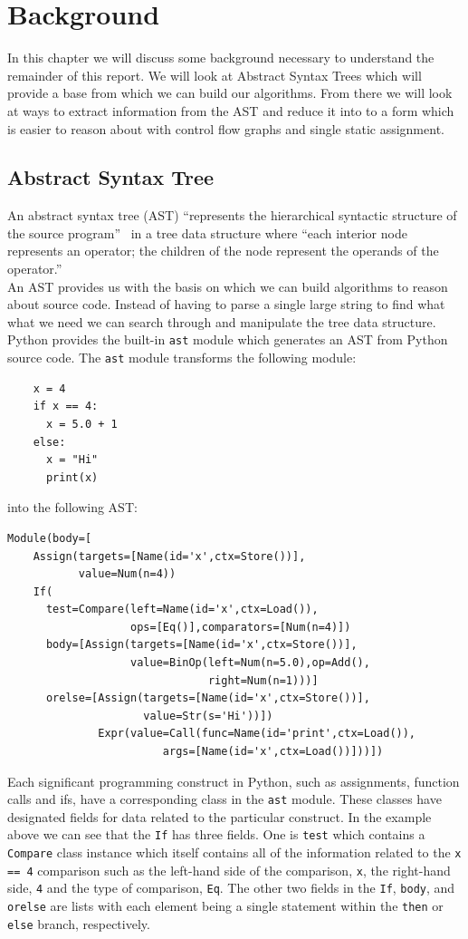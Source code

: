 \documentclass[12pt, titlepage]{article}
\begin{document}
\newpage
\section{Background}
In this chapter we will discuss some background necessary to understand the remainder of this report. We will look at Abstract Syntax Trees which will provide a base from which we can build our algorithms. From there we will look at ways to extract information from the AST and reduce it into to a form which is easier to reason about with control flow graphs and single static assignment.

\subsection{Abstract Syntax Tree}
An abstract syntax tree (AST) ``represents the hierarchical syntactic structure of the source 
program''~\cite{dragonBook} in a tree data structure where ``each 
interior node represents an operator; the children of the node represent the 
operands of the operator.''~\cite{dragonBook} \\
\indent An AST provides us with the basis on which we can build algorithms to reason about source code. Instead of having to parse a single large string to find what what we need we can search through and manipulate the tree data structure. \\
\indent Python provides the built-in \texttt{ast} module which generates an AST from Python source code. The \texttt{ast} module transforms the following module:
\begin{lstlisting}
    x = 4
    if x == 4:
      x = 5.0 + 1
    else:
      x = "Hi"
      print(x)
\end{lstlisting}
into the following AST:
\begin{verbatim}
Module(body=[
    Assign(targets=[Name(id='x',ctx=Store())],
           value=Num(n=4))
    If(
      test=Compare(left=Name(id='x',ctx=Load()),
                   ops=[Eq()],comparators=[Num(n=4)])
      body=[Assign(targets=[Name(id='x',ctx=Store())],
                   value=BinOp(left=Num(n=5.0),op=Add(),
                               right=Num(n=1)))]
      orelse=[Assign(targets=[Name(id='x',ctx=Store())],
                     value=Str(s='Hi'))])
              Expr(value=Call(func=Name(id='print',ctx=Load()),
                        args=[Name(id='x',ctx=Load())]))])
\end{verbatim}
Each significant programming construct in Python, such as assignments, function calls and ifs, have a corresponding class in the \texttt{ast} module. These classes have designated fields for data related to the particular construct. In the example above we can see that the \texttt{If} has three fields. One is \texttt{test} which contains a \texttt{Compare} class instance which itself contains all of the information related to the \texttt{x == 4} comparison such as the left-hand side of the comparison, \texttt{x}, the right-hand side, \texttt{4} and the type of comparison, \texttt{Eq}. The other two fields in the \texttt{If}, \texttt{body}, and \texttt{orelse} are lists with each element being a single statement within the \texttt{then} or \texttt{else} branch, respectively. \\
\end{document}

